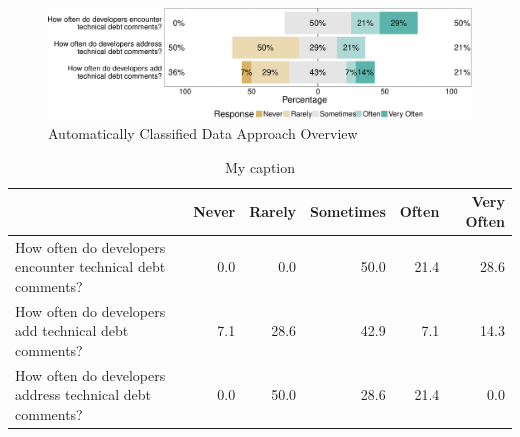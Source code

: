 \begin{figure}[tb]
	\centering
	\includegraphics[width=\columnwidth]{figures/test/responses_question.pdf}
	\caption{Automatically Classified Data Approach Overview}
	\label{fig:automatically_classified_data_approach_overview_}
\end{figure}



\begin{table}[]
	\centering
	\caption{My caption}
	\label{my-label}
	\begin{tabular}{@{}lrrrrr@{}}
		\toprule
		\textbf{} & \textbf{Never} & \textbf{Rarely} & \textbf{Sometimes} & \textbf{Often} & \textbf{Very Often} \\ \midrule
		How often do developers encounter technical debt comments? & 0.0 & 0.0 & 50.0 & 21.4 & 28.6 \\
		How often do developers add technical debt comments? & 7.1 & 28.6 & 42.9 & 7.1 & 14.3 \\
		How often do developers address technical debt comments? & 0.0 & 50.0 & 28.6 & 21.4 & 0.0 \\ \bottomrule
	\end{tabular}
\end{table}








